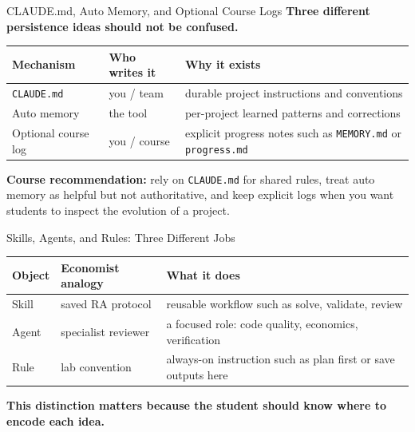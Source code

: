 \documentclass[10pt,english,aspectratio=169]{beamer}
\begin{document}
\begin{frame}{CLAUDE.md, Auto Memory, and Optional Course Logs}
\textbf{Three different persistence ideas should not be confused.}

\vspace{0.2cm}

\begin{center}
\small
\begin{tabular}{|p{2.4cm}|p{2.4cm}|p{5.3cm}|}
\hline
\textbf{Mechanism} & \textbf{Who writes it} & \textbf{Why it exists} \\ \hline
\texttt{CLAUDE.md} & you / team & durable project instructions and conventions \\ \hline
Auto memory & the tool & per-project learned patterns and corrections \\ \hline
Optional course log & you / course & explicit progress notes such as \texttt{MEMORY.md} or \texttt{progress.md} \\ \hline
\end{tabular}
\end{center}

\vspace{0.25cm}

\textbf{Course recommendation:} rely on \texttt{CLAUDE.md} for shared rules, treat auto memory as helpful but not authoritative, and keep explicit logs when you want students to inspect the evolution of a project.
\end{frame}

\begin{frame}{Skills, Agents, and Rules: Three Different Jobs}
\begin{center}
\small
\begin{tabular}{|p{2.2cm}|p{2.4cm}|p{5.6cm}|}
\hline
\textbf{Object} & \textbf{Economist analogy} & \textbf{What it does} \\ \hline
Skill & saved RA protocol & reusable workflow such as solve, validate, review \\ \hline
Agent & specialist reviewer & a focused role: code quality, economics, verification \\ \hline
Rule & lab convention & always-on instruction such as plan first or save outputs here \\ \hline
\end{tabular}
\end{center}

\vspace{0.25cm}

\textbf{This distinction matters because the student should know where to encode each idea.}
\end{frame}
\end{document}
